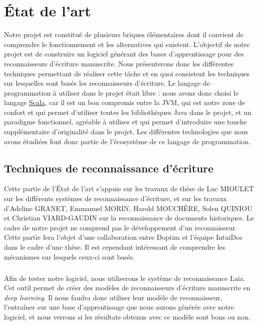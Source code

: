\hypertarget{c5}{\chapter{État de l'art}}

Notre projet est constitué de plusieurs briques élémentaires dont il convient de comprendre
le fonctionnement et les alternatives qui existent. L'objectif de notre projet est de construire
un logiciel générant des bases d'apprentissage pour des reconnaisseurs d'écriture manuscrite.
Nous présenterons donc les différentes techniques permettant de réaliser cette tâche et en quoi
consistent les techniques sur lesquelles sont basés les reconnaisseurs d'écriture. Le langage de
programmation à utiliser dans le projet était libre : nous avons donc choisi le langage
\href{http://scala-lang.org}{Scala}, car il est un bon compromis entre la JVM, qui est notre zone
de confort et qui permet d'utiliser toutes les bibliothèques Java dans le projet, et un paradigme
fonctionnel, agréable à utiliser et qui permet d'introduire une touche supplémentaire d'originalité
dans le projet. Les différentes technologies que nous avons étudiées font donc partie de l'écosystème
de ce langage de programmation.

\section{Techniques de reconnaissance d'écriture}

Cette partie de l'État de l'art s'appuie sur les travaux de thèse de Luc MIOULET\cite{mioulet:2015} sur les différents
systèmes de reconnaissance d'écriture, et sur les travaux d'Adeline GRANET, Emmanuel MORIN, Harold MOUCHÈRE,
Solen QUINIOU et Christian VIARD-GAUDIN sur la reconnaissance de documents historiques\cite{rececr:2017}. Le cadre de notre
projet ne comprend pas le développement d'un reconnaisseur. Cette partie fera l'objet d'une collaboration
entre Doptim et l'équipe IntuiDoc dans le cadre d'une thèse. Il est cependant intéressant de comprendre
les mécanismes sur lesquels ceux-ci sont basés.

\paragraph{}
Afin de tester notre logiciel, nous utiliserons le système de reconnaissance Laia. Cet outil permet
de créer des modèles de reconnaisseurs d'écriture manuscrite en \textit{deep learning}. Il nous
faudra donc utiliser leur modèle de reconnaisseur, l'entraîner sur une base d'apprentissage que nous aurons
générée avec notre logiciel, et nous verrons si les résultats obtenus avec ce modèle sont bons ou non. 

